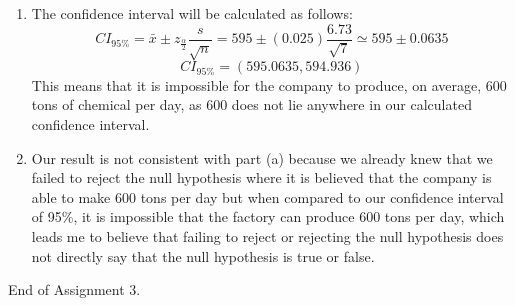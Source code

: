 \documentclass[12pt]{article}
\begin{document}
\begin{enumerate}
\begin{enumerate}
			\item The confidence interval will be calculated as follows:
			$$CI_{95\%} = \bar{x} \pm z_{\frac{\alpha}{2}} \frac{s}{\sqrt{n}} = 595 \pm (0.025)\frac{6.73}{\sqrt{7}} \simeq 595 \pm 0.0635$$
			$$CI_{95\%} = (595.0635, 594.936)$$
			This means that it is impossible for the company to produce, on average, 600 tons of chemical per day, as 600 does not lie anywhere in our calculated confidence interval.
			\item Our result is not consistent with part (a) because we already knew that we failed to reject the null hypothesis where it is believed that the company is able to make 600 tons per day but when compared to our confidence interval of 95\%, it is impossible that the factory can produce 600 tons per day, which leads me to believe that failing to reject or rejecting the null hypothesis does not directly say that the null hypothesis is true or false.
		\end{enumerate}
\end{enumerate}
End of Assignment 3.
\end{document}
